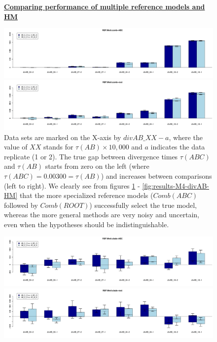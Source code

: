 \documentclass[11pt]{article}
\newcommand{\1}{\mathbbm{1}}
\newcommand{\figuretitle}[1]{
	\centering
	\underline{\textbf{#1}}
	\par
	\medskip
}
\begin{document}
\begin{figure}[H]

\figuretitle{Comparing performance of multiple reference models and HM}

\includegraphics[width=1.0\textwidth]{results/results-M4-divAB/M4-divAB-results-comb_ABC}

\includegraphics[width=1.0\textwidth]{results/results-M4-divAB/M4-divAB-results-comb_ROOT}

\captionsetup{width=0.8\textwidth}
\caption{ 
Data sets are marked on the X-axis by $divAB\_XX-a$, where the value of $XX$ stands for $\tau(AB) \times 10,000$ and $a$ indicates the data replicate (1 or 2).
%
The true gap between divergence times $\tau(ABC)$ and $\tau(AB)$ starts from zero on the left (where $\tau(ABC) = 0.00300 = \tau(AB)$) and increases between comparisons (left to right).
%
We clearly see from figures \ref{fig:results-M4-divAB-comb} -  \ref{fig:results-M4-divAB-HM} that the more specialized reference models ($Comb(ABC)$ followed by $Comb(ROOT)$) successfully select the true model, whereas the  more general methods are very noisy and uncertain, even when the hypotheses should be indistinguishable.}
\label{fig:results-M4-divAB-comb}
\end{figure}

\begin{figure}[H]
\includegraphics[width=1.0\textwidth]{results/results-M4-divAB/M4-divAB-results-clade_ABC}
\includegraphics[width=1.0\textwidth]{results/results-M4-divAB/M4-divAB-results-clade_ROOT}
\caption{ }
\label{fig:results-M4-divAB-clade}
\end{figure}
\end{document}
